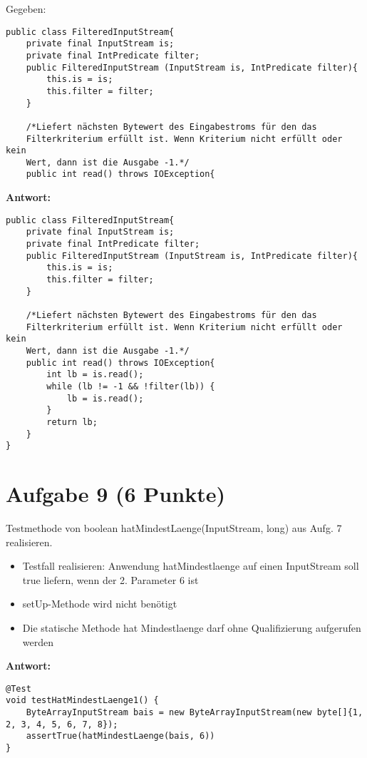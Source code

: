 Gegeben:

\begin{lstlisting}
public class FilteredInputStream{
    private final InputStream is;
    private final IntPredicate filter;
    public FilteredInputStream (InputStream is, IntPredicate filter){
        this.is = is;
        this.filter = filter;
    }

    /*Liefert nächsten Bytewert des Eingabestroms für den das
    Filterkriterium erfüllt ist. Wenn Kriterium nicht erfüllt oder kein
    Wert, dann ist die Ausgabe -1.*/
    public int read() throws IOException{
\end{lstlisting}

\textbf{Antwort:}

\begin{lstlisting}
public class FilteredInputStream{
    private final InputStream is;
    private final IntPredicate filter;
    public FilteredInputStream (InputStream is, IntPredicate filter){
        this.is = is;
        this.filter = filter;
    }

    /*Liefert nächsten Bytewert des Eingabestroms für den das
    Filterkriterium erfüllt ist. Wenn Kriterium nicht erfüllt oder kein
    Wert, dann ist die Ausgabe -1.*/
    public int read() throws IOException{
        int lb = is.read();
        while (lb != -1 && !filter(lb)) {
            lb = is.read();
        }
        return lb;
    }
}
\end{lstlisting}

\section{Aufgabe 9 (6 Punkte)}
Testmethode von boolean hatMindestLaenge(InputStream, long) aus Aufg. 7
realisieren.

\begin{itemize}
    \item Testfall realisieren: Anwendung hatMindestlaenge auf einen InputStream soll
          true liefern, wenn der 2. Parameter 6 ist
    \item setUp-Methode wird nicht benötigt
    \item Die statische Methode hat Mindestlaenge darf ohne Qualifizierung aufgerufen
          werden
\end{itemize}

\textbf{Antwort:}

\begin{lstlisting}
@Test
void testHatMindestLaenge1() {
    ByteArrayInputStream bais = new ByteArrayInputStream(new byte[]{1, 2, 3, 4, 5, 6, 7, 8});
    assertTrue(hatMindestLaenge(bais, 6))
}
\end{lstlisting}

